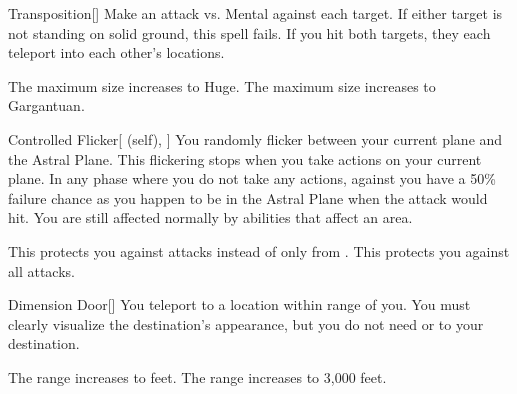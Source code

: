 \lowercase{\hypertarget{spell:Transposition}{}}\label{spell:Transposition}
\begin{freeability}[Rank 3]{\hypertarget{spell:Transposition}{Transposition}}[]
Make an attack vs. Mental against each target.
If either target is not standing on solid ground, this spell fails.
If you hit both targets, they each teleport into each other's locations.

\rankline
{} The maximum size increases to Huge.
 The maximum size increases to Gargantuan.
\end{freeability}
\vspace{0.25em}



\lowercase{\hypertarget{spell:Controlled Flicker}{}}\label{spell:Controlled Flicker}
\begin{attuneability}[Rank 4]{\hypertarget{spell:Controlled Flicker}{Controlled Flicker}}[ (self), ]
You randomly flicker between your current plane and the Astral Plane.
This flickering stops when you take actions on your current plane.
In any phase where you do not take any actions,   against you have a 50\% failure chance as you happen to be in the Astral Plane when the attack would hit.
You are still affected normally by abilities that affect an area.

\rankline
{} This protects you against   attacks instead of only from .
 This protects you against all  attacks.
\end{attuneability}
\vspace{0.25em}



\lowercase{\hypertarget{spell:Dimension Door}{}}\label{spell:Dimension Door}
\begin{freeability}[Rank 4]{\hypertarget{spell:Dimension Door}{Dimension Door}}[]
You teleport to a location within \rnglong range of you.
You must clearly visualize the destination's appearance, but you do not need  or  to your destination.

\rankline
{} The range increases to \rngext feet.
 The range increases to 3,000 feet.
\end{freeability}
\vspace{0.25em}



